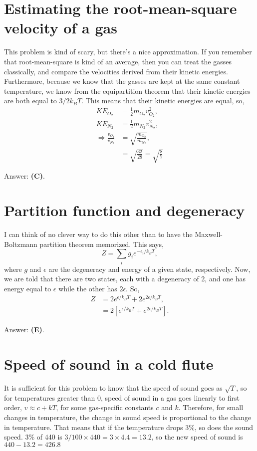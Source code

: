 \documentclass[11pt]{paper}
\newcommand{\answer}[1]{Answer: \textbf{(#1)}.}
\begin{document}
\section{Estimating the root-mean-square velocity of a gas}
This problem is kind of scary, but there's a nice approximation.  If you remember that root-mean-square is kind of an average, then you can treat the gasses classically, and compare the velocities derived from their kinetic energies.  Furthermore, because we know that the gasses are kept at the same constant temperature, we know from the equipartition theorem that their kinetic energies are both equal to $3/2k_BT$.  This means that their kinetic energies are equal, so, 
\begin{align}
KE_{O_2} &= \frac{1}{2}m_{O_2}v_{O_2}^2,\\
KE_{N_2} &= \frac{1}{2}m_{N_2}v_{N_2}^2,\\
\Rightarrow \frac{v_{O_2}}{v_{N_2}} &= \sqrt{\frac{m_{O_2}}{{m_{N_2}}}},\\
&= \sqrt{\frac{32}{28}} = \sqrt{\frac{8}{7}}
\end{align}

\answer{C}
\section{Partition function and degeneracy}
I can think of no clever way to do this other than to have the Maxwell-Boltzmann partition theorem memorized.  This says,
\begin{equation}
Z = \sum_i g_i e^{-\epsilon_i/k_BT},
\end{equation}
where $g$ and $\epsilon$ are the degeneracy and energy of a given state, respectively.  Now, we are told that there are two states, each with a degeneracy of 2, and one has energy equal to $\epsilon$ while the other has $2\epsilon$.  So,
\begin{align}
Z &= 2e^{\epsilon/k_BT}+2e^{2\epsilon/k_BT},\\
&= 2\left[e^{\epsilon/k_BT}+e^{2\epsilon/k_BT}\right].
\end{align}

\answer{E}

\section{Speed of sound in a cold flute}
It is sufficient for this problem to know that the speed of sound goes as $\sqrt{T}$, so for temperatures greater than 0, speed of sound in a gas goes linearly to first order, $v \approx c + kT$, for some gas-specific constants $c$ and $k$.  Therefore, for small changes in temperature, the change in sound speed is proportional to the change in temperature.  That means that if the temperature drops 3\%, so does the sound speed.  3\% of 440 is $3/100\times440 = 3\times4.4 = 13.2$, so the new speed of sound is $440-13.2 = 426.8$\\
\end{document}
